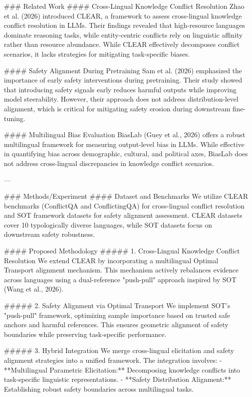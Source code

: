 ### Related Work  
#### Cross-Lingual Knowledge Conflict Resolution  
Zhao et al. (2026) introduced CLEAR, a framework to assess cross-lingual knowledge conflict resolution in LLMs. Their findings revealed that high-resource languages dominate reasoning tasks, while entity-centric conflicts rely on linguistic affinity rather than resource abundance. While CLEAR effectively decomposes conflict scenarios, it lacks strategies for mitigating task-specific biases.

#### Safety Alignment During Pretraining  
Sam et al. (2026) emphasized the importance of early safety interventions during pretraining. Their study showed that introducing safety signals early reduces harmful outputs while improving model steerability. However, their approach does not address distribution-level alignment, which is critical for mitigating safety erosion during downstream fine-tuning.

#### Multilingual Bias Evaluation  
BiasLab (Guey et al., 2026) offers a robust multilingual framework for measuring output-level bias in LLMs. While effective in quantifying bias across demographic, cultural, and political axes, BiasLab does not address cross-lingual discrepancies in knowledge conflict scenarios.

---

### Methods/Experiment  
#### Dataset and Benchmarks  
We utilize CLEAR benchmarks (ConflictQA and ConflictingQA) for cross-lingual conflict resolution and SOT framework datasets for safety alignment assessment. CLEAR datasets cover 10 typologically diverse languages, while SOT datasets focus on downstream safety robustness.  

#### Proposed Methodology  
##### 1. Cross-Lingual Knowledge Conflict Resolution  
We extend CLEAR by incorporating a multilingual Optimal Transport alignment mechanism. This mechanism actively rebalances evidence across languages using a dual-reference "push-pull" approach inspired by SOT (Wang et al., 2026).  

##### 2. Safety Alignment via Optimal Transport  
We implement SOT's "push-pull" framework, optimizing sample importance based on trusted safe anchors and harmful references. This ensures geometric alignment of safety boundaries while preserving task-specific performance.

##### 3. Hybrid Integration  
We merge cross-lingual elicitation and safety alignment strategies into a unified framework. The integration involves:  
- **Multilingual Parametric Elicitation:** Decomposing knowledge conflicts into task-specific linguistic representations.  
- **Safety Distribution Alignment:** Establishing robust safety boundaries across multilingual tasks.  


